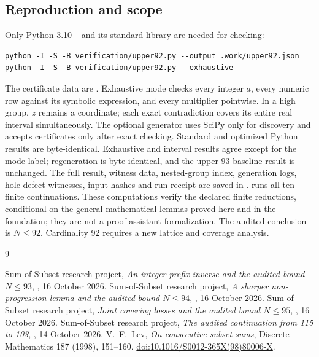 \documentclass[11pt,a4paper]{article}
\begin{document}
\subsection*{Reproduction and scope}
Only Python 3.10+ and its standard library are needed for checking:
\begin{verbatim}
python -I -S -B verification/upper92.py --output .work/upper92.json
python -I -S -B verification/upper92.py --exhaustive
\end{verbatim}
The certificate data are .
Exhaustive mode checks every integer $a$, every numeric row against
its symbolic expression, and every multiplier pointwise. In a high group,
$z$ remains a coordinate; each exact contradiction covers its entire
real interval simultaneously. The optional generator
 uses SciPy only
for discovery and accepts certificates only after exact checking.
Standard and optimized Python results are byte-identical. Exhaustive
and interval results agree except for the mode label; regeneration is
byte-identical, and the upper-93 baseline result is unchanged.
The full result, witness data, nested-group index, generation logs,
hole-defect witnesses, input hashes and run receipt are saved in
.
 runs all ten finite continuations.
These computations verify the declared finite reductions, conditional
on the general mathematical lemmas proved here and in the foundation;
they are not a proof-assistant formalization. The audited conclusion is
$N\le92$. Cardinality 92 requires a new lattice and coverage analysis.

\begin{thebibliography}{9}\raggedright
{} Sum-of-Subset research project,
\emph{An integer prefix inverse and the audited bound $N\le93$},
, 16 October 2026.
 Sum-of-Subset research project,
\emph{A sharper non-progression lemma and the audited bound $N\le94$},
, 16 October 2026.
 Sum-of-Subset research project,
\emph{Joint covering losses and the audited bound $N\le95$},
, 16 October 2026.
 Sum-of-Subset research project,
\emph{The audited continuation from 115 to 103},
, 14 October 2026.
 V.~F.~Lev, \emph{On consecutive subset sums},
Discrete Mathematics 187 (1998), 151--160.
\href{https://doi.org/10.1016/S0012-365X(98)80006-X}{doi:10.1016/S0012-365X(98)80006-X}.
\end{thebibliography}
\end{document}
